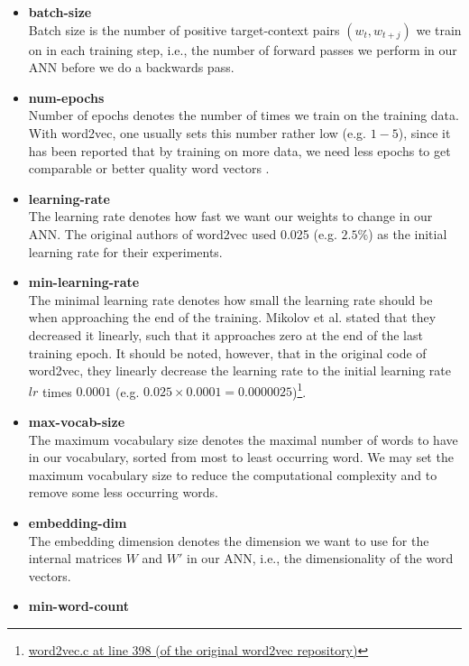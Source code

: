 \begin{itemize}
    \item \textbf{batch-size} \\
        Batch size is the number of positive target-context pairs $(w_t, w_{t+j})$ we train on in each training step, i.e., the number of forward passes we perform in our ANN before we do a backwards pass.
    \item \textbf{num-epochs} \\
        Number of epochs denotes the number of times we train on the training data. With word2vec, one usually sets this number rather low (e.g. $1-5$), since it has been reported that by training on more data, we need less epochs to get comparable or better quality word vectors \cite{mikolov2013a}.
    \item \textbf{learning-rate} \\
        The learning rate denotes how fast we want our weights to change in our ANN. The original authors of word2vec used 0.025 (e.g. $2.5\%$) as the initial learning rate for their experiments.
    \item \textbf{min-learning-rate} \\
        The minimal learning rate denotes how small the learning rate should be when approaching the end of the training. Mikolov et al. stated that they decreased it linearly, such that it approaches zero at the end of the last training epoch. It should be noted, however, that in the original code of word2vec, they linearly decrease the learning rate to the initial learning rate $lr$ times $0.0001$ (e.g. $0.025 \times 0.0001 = 0.0000025$)\footnote{\href{https://github.com/tmikolov/word2vec/blob/e092540633572b883e25b367938b0cca2cf3c0e7/word2vec.c\#L398}{word2vec.c at line 398 (of the original word2vec repository)}}.
    \item \textbf{max-vocab-size} \\
        The maximum vocabulary size denotes the maximal number of words to have in our vocabulary, sorted from most to least occurring word. We may set the maximum vocabulary size to reduce the computational complexity and to remove some less occurring words.
    \item \textbf{embedding-dim} \\
        The embedding dimension denotes the dimension we want to use for the internal matrices $W$ and $W'$ in our ANN, i.e., the dimensionality of the word vectors.
    \item \textbf{min-word-count} \\

\end{itemize}
